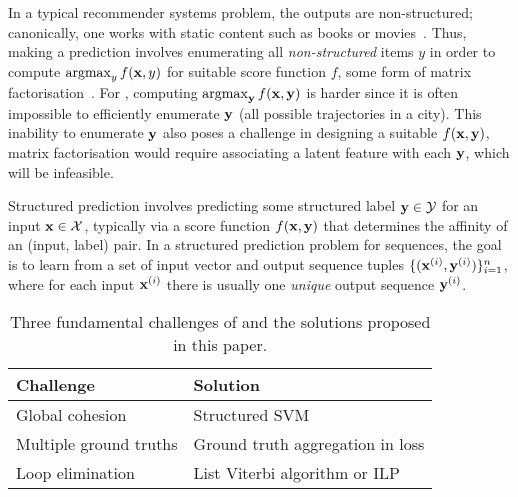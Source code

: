 In a typical recommender systems problem, the outputs are non-structured; canonically, one works with {static} content such as books or movies~\citep{Goldberg:1992,Sarwar:2001,Netflix}.
Thus, making a prediction involves enumerating all {\em non-structured} items $y$ in order to compute $\operatorname*{argmax}_y f(\mathbf{x},y)$ for suitable score function $f$, \eg some form of matrix factorisation~\citep{Koren:2009}.
For {\seqrec}, computing $\operatorname*{argmax}_{\mathbf{y}} f(\mathbf{x},\mathbf{y})$ is harder since it is often impossible to efficiently enumerate $\mathbf{y}$ (\eg all possible trajectories in a city).
This inability to enumerate $\mathbf{y}$ also poses a challenge in designing a suitable $f(\mathbf{x},\mathbf{y})$,
\eg
matrix factorisation
would require associating a latent feature with each $\mathbf{y}$, which will be infeasible.



Structured prediction involves predicting some structured label $\mathbf{y} \in \mathcal{Y}$ for an input $\mathbf{x} \in \mathcal{X}$,
typically via a score function $f(\mathbf{x},\mathbf{y})$ that determines the affinity of an (input, label) pair.
In a structured prediction problem for sequences, the goal is to learn from a set of input vector and output sequence tuples
$\{ (\mathbf{x}^{({i})}, \mathbf{y}^{({i})}) \}_{i = 1}^n$, where
for each input $\mathbf{x}^{({i})}$ there is usually one \emph{unique} output sequence $\mathbf{y}^{({i})}$.

\begin{table}[t]
	\centering
	\begin{tabular}{ll}
	\hline
	\hline
	{\bf Challenge}                    & {\bf Solution}                             \\ \hline
	Global cohesion                    & Structured SVM                             \\ \hline
	Multiple ground truths             & Ground truth aggregation in loss 			\\ \hline
	Loop elimination                   & List Viterbi algorithm or ILP              \\ \hline
	\end{tabular}
	\caption{Three fundamental challenges of \trajrec and the solutions proposed in this paper.}
	\label{tbl:challenges}
\end{table}

